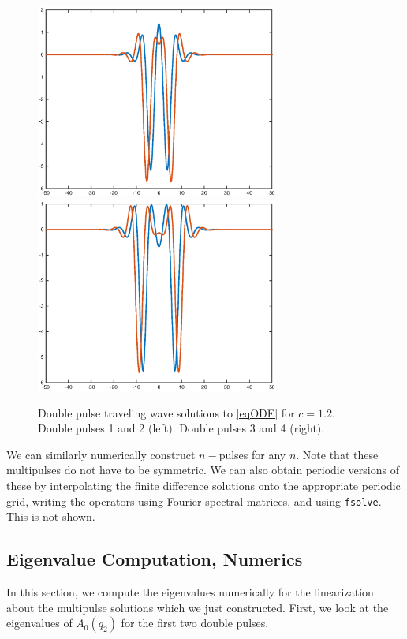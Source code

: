 \documentclass[12pt]{article}
\begin{document}
\begin{figure}[H]
\centering
\includegraphics[width=8cm]{double12_12.eps}
\includegraphics[width=8cm]{double12_34.eps}
\caption{Double pulse traveling wave solutions to \eqref{eqODE} for $c = 1.2$. Double pulses 1 and 2 (left). Double pulses 3 and 4 (right).}
\end{figure}

We can similarly numerically construct $n-$pulses for any $n$. Note that these multipulses do not have to be symmetric. We can also obtain periodic versions of these by interpolating the finite difference solutions onto the appropriate periodic grid, writing the operators using Fourier spectral matrices, and using \texttt{fsolve}. This is not shown.\\

\subsection{Eigenvalue Computation, Numerics}

In this section, we compute the eigenvalues numerically for the linearization about the multipulse solutions which we just constructed. First, we look at the eigenvalues of $A_0(q_2)$ for the first two double pulses.
\end{document}
